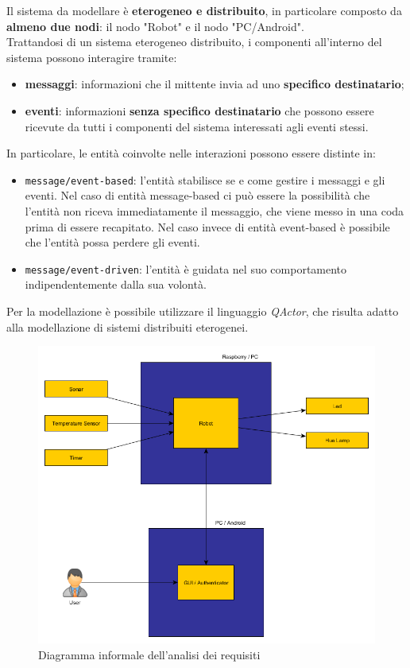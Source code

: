 \documentclass{llncs}
\newcommand{\code}[1]{{\color{blue}\small{\texttt{#1}}}}
\newcommand{\qa}{\textsf{\textit{QActor}}}
\begin{document}
Il sistema da modellare è \textbf{eterogeneo e distribuito}, in particolare composto da \textbf{almeno due nodi}: il nodo "Robot" e il nodo "PC/Android". \\
Trattandosi di un sistema eterogeneo distribuito, i componenti all'interno del sistema possono interagire tramite:
\begin{itemize}
	\setlength\itemsep{0em}
	\item \textbf{messaggi}: informazioni che il mittente invia ad uno \textbf{specifico destinatario};
	\item \textbf{eventi}: informazioni \textbf{senza specifico destinatario} che possono essere ricevute da tutti i componenti del sistema interessati agli eventi stessi.
\end{itemize}
In particolare, le entità coinvolte nelle interazioni possono essere distinte in:
\begin{itemize}
	\setlength\itemsep{0em}
	\item \code{message/event-based}: l'entità stabilisce se e come gestire i messaggi e gli eventi. Nel caso di entità message-based ci può essere la possibilità che l'entità non riceva immediatamente il messaggio, che viene messo in una coda prima di essere recapitato. Nel caso invece di entità event-based è possibile che l'entità possa perdere gli eventi.
	\item \code{message/event-driven}: l'entità è guidata nel suo comportamento indipendentemente dalla sua volontà.	
\end{itemize}

Per la modellazione è possibile utilizzare il linguaggio \qa, che risulta adatto alla modellazione di sistemi distribuiti eterogenei. 

\begin{figure}[h]
	\centering
	\includegraphics[scale=0.4]{img/requirements_analysis.png}
	\caption{Diagramma informale dell'analisi dei requisiti}
	\label{fig:reqAnalysis}
\end{figure}
\end{document}
